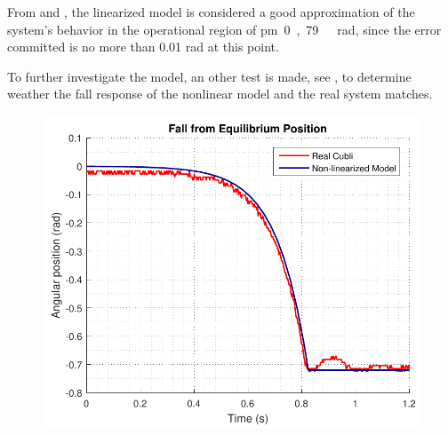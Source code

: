 From  and , the linearized model is considered a good approximation of the system's behavior in the operational region of \si{\pm 0,79\ rad}, since the error committed is no more than 0.01 rad at this point.

To further investigate the model, an other test is made, see , to determine weather the fall response of the nonlinear model and the real system matches.

\begin{minipage}{\linewidth}
	\begin{minipage}{0.5\linewidth}
		\begin{figure}[H]
			\includegraphics[scale=.48]{figures/FallTestComparison}
			\centering
			\captionsetup{justification=centering}
			\label{FallTestComparison}
		\end{figure}%
	\end{minipage}
	\begin{minipage}{0.5\linewidth}
		\begin{figure}[H]%

\end{figure}
\end{minipage}
\end{minipage}

